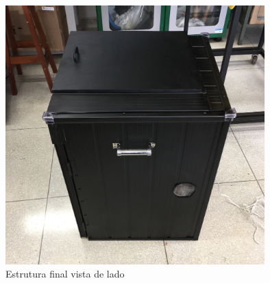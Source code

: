 \begin{figure}[!htb]
	\centering
	\includegraphics[width=10cm]{figuras/estufapreta_lado.JPG}
	\caption{Estrutura final vista de lado}
	\label{fig:estufapreta_lado }
\end{figure}
